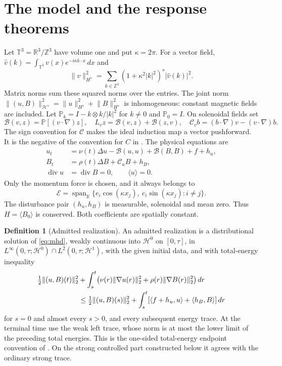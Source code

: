 \documentclass[11pt,a4paper]{amsart}
\theoremstyle{definition}
\newtheorem{definition}[theorem]{Definition}
\theoremstyle{remark}
\numberwithin{equation}{section}
\newcommand{\T}{\mathbb T}
\newcommand{\R}{\mathbb R}
\newcommand{\Z}{\mathbb Z}
\newcommand{\PP}{\mathbb P}
\newcommand{\Bcal}{\mathcal B}
\newcommand{\Ccal}{\mathcal C}
\newcommand{\Hcal}{\mathcal H}
\newcommand{\Ecal}{\mathcal E}
\newcommand{\ip}[2]{\langle #1,#2\rangle}
\newcommand{\norm}[1]{\lVert #1\rVert}
\newcommand{\mean}[1]{\langle #1\rangle}
\newcommand{\diver}{\operatorname{div}}
\begin{document}
\section{The model and the response theorems}\label{sec:model}
Let $\T^3=\R^3/\Z^3$ have volume one and put $\kappa=2\pi$.
For a vector field, $\widehat v(k)=\int_{\T^3}v(x)e^{-i\kappa k\cdot x}\,dx$ and
\[
 \norm v_{H^s}^2=\sum_{k\in\Z^3}(1+\kappa^2|k|^2)^s|\widehat v(k)|^2.
\]
Matrix norms sum these squared norms over the entries. The joint norm
$\norm{(u,B)}_{\Hcal^s}^2=\norm u_{H^s}^2+\norm B_{H^s}^2$ is inhomogeneous:
constant magnetic fields are included. Let $\PP_k=I-k\otimes k/|k|^2$ for
$k\ne0$ and $\PP_0=I$. On solenoidal fields set
\[
 \Bcal(v,z)=\PP[(v\cdot\nabla)z],\quad
 L_vz=\Bcal(v,z)+\Bcal(z,v),\quad
 \Ccal_vb=(b\cdot\nabla)v-(v\cdot\nabla)b.
\]
The sign convention for $\Ccal$ makes the ideal induction map a vector
pushforward. It is the negative of the convention for $C$ in \cite{Common}.
The physical equations are
\begin{equation}\label{eq:mhd}
 \begin{aligned}
 u_t&=\nu(t)\Delta u-\Bcal(u,u)+\Bcal(B,B)+f+h_u,\\
 B_t&=\rho(t)\Delta B+\Ccal_uB+h_B,\\
 \diver u&=\diver B=0,\qquad \mean u=0.
 \end{aligned}
\end{equation}
Only the momentum force is chosen, and it always belongs to
\begin{equation}\label{eq:actuators}
 \Ecal=\operatorname{span}_{\R}
 \{e_i\cos(\kappa x_j),\ e_i\sin(\kappa x_j):i\ne j\}.
\end{equation}
The disturbance pair $(h_u,h_B)$ is measurable, solenoidal and mean zero.
Thus $H=\mean{B_0}$ is conserved. Both coefficients are spatially constant.

\begin{definition}[Admitted realization]\label{def:weak}
An admitted realization is a distributional solution of \eqref{eq:mhd},
weakly continuous into $\Hcal^0$ on $[0,\tau]$, in
$L^\infty(0,\tau;\Hcal^0)\cap L^2(0,\tau;\Hcal^1)$, with the given initial data,
and with total-energy inequality
\begin{align}\label{eq:energy}
 \tfrac12\norm{(u,B)(t)}_2^2
 &+\int_s^t\bigl(\nu(r)\norm{\nabla u(r)}_2^2+
                  \rho(r)\norm{\nabla B(r)}_2^2\bigr)\,dr\notag\\
 &\le\tfrac12\norm{(u,B)(s)}_2^2+
 \int_s^t[\ip{f+h_u}{u}+\ip{h_B}{B}]\,dr
\end{align}
for $s=0$ and almost every $s>0$, and every subsequent energy trace.
At the terminal time use the weak left trace, whose norm is at most the lower
limit of the preceding total energies. This is the one-sided total-energy
endpoint convention of \cite[Definition~2.1]{Common}. On the strong controlled
part constructed below it agrees with the ordinary strong trace.
\end{definition}
\end{document}

